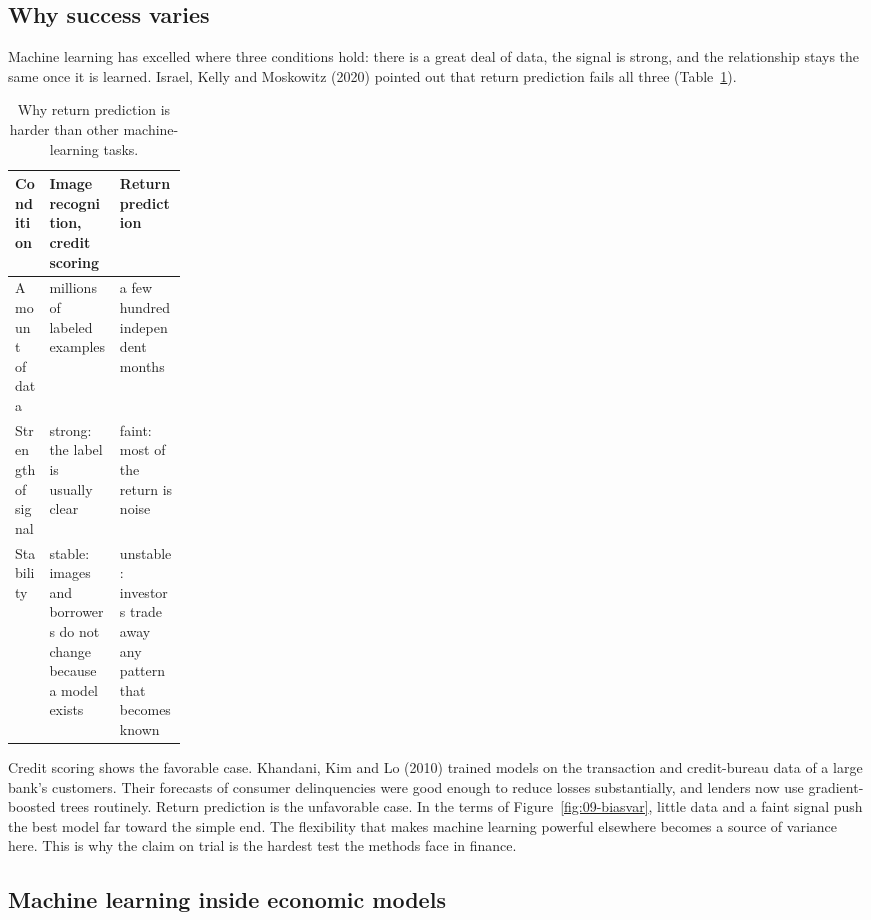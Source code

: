 \subsection{Why success varies}

Machine learning has excelled where three conditions hold: there is a great deal of data, the signal is strong, and the relationship stays the same once it is learned. Israel, Kelly and Moskowitz (2020) pointed out that return prediction fails all three (Table~\ref{tab:20-conditions}).

\begin{table}[htbp]
\centering
\small
\caption{Why return prediction is harder than other machine-learning tasks.}
\label{tab:20-conditions}
\begin{tabularx}{0.9\linewidth}{@{}>{\raggedright\arraybackslash}p{0.2\linewidth}>{\raggedright\arraybackslash}X>{\raggedright\arraybackslash}X@{}}
\toprule
Condition & Image recognition, credit scoring & Return prediction \\
\midrule
Amount of data & millions of labeled examples & a few hundred independent months \\
Strength of signal & strong: the label is usually clear & faint: most of the return is noise \\
Stability & stable: images and borrowers do not change because a model exists & unstable: investors trade away any pattern that becomes known \\
\bottomrule
\end{tabularx}
\end{table}

Credit scoring shows the favorable case. Khandani, Kim and Lo (2010) trained models on the transaction and credit-bureau data of a large bank's customers. Their forecasts of consumer delinquencies were good enough to reduce losses substantially, and lenders now use gradient-boosted trees routinely. Return prediction is the unfavorable case. In the terms of Figure~\ref{fig:09-biasvar}, little data and a faint signal push the best model far toward the simple end. The flexibility that makes machine learning powerful elsewhere becomes a source of variance here. This is why the claim on trial is the hardest test the methods face in finance.

\subsection{Machine learning inside economic models}

